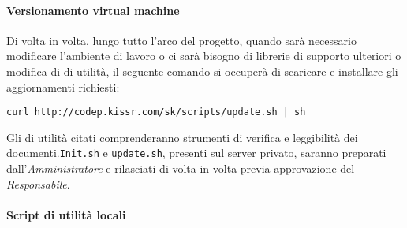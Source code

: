 \documentclass{scalatekids-article}
\begin{document}
\paragraph{Versionamento virtual machine}

Di volta in volta, lungo tutto l'arco del progetto, quando sarà necessario
modificare l'ambiente di lavoro o ci sarà bisogno di librerie di supporto
ulteriori o modifica di  di utilità, il seguente comando si
occuperà di scaricare e installare gli aggiornamenti richiesti:
\begin{center}
    \verb=curl http://codep.kissr.com/sk/scripts/update.sh | sh=
\end{center}
Gli  di utilità citati comprenderanno strumenti di verifica e
leggibilità dei documenti.\verb=Init.sh= e \verb=update.sh=,
presenti sul server privato, saranno preparati dall'\textit{Amministratore} e
rilasciati di volta in volta previa approvazione del \textit{Responsabile}.

\paragraph{Script di utilità locali}
\end{document}
